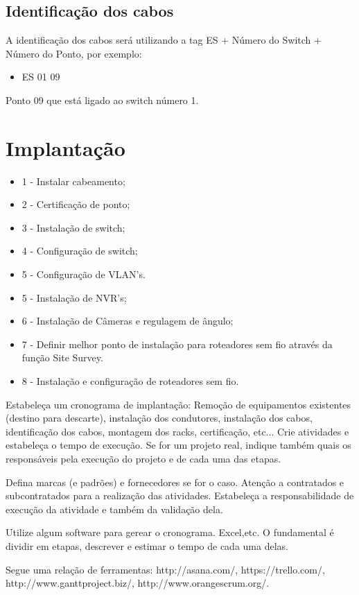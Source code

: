 \documentclass[	DIV=calc,%
							paper=a4,%
							fontsize=12pt,%
							onecolumn]{scrartcl}	 					%
\begin{document}
\subsection{Identificação dos cabos}

A identificação dos cabos será utilizando a tag ES + Número do Switch + Número do Ponto, por exemplo:
\begin{itemize}
\item ES 01 09
\end{itemize}
Ponto 09 que está ligado ao switch número 1.

\section{Implantação}
\begin{itemize}
\item 1 - Instalar cabeamento;
\item 2 - Certificação de ponto;
\item 3 - Instalação de switch;
\item 4 - Configuração de switch;
\item 5 - Configuração de VLAN's.
\item 5 - Instalação de NVR's;
\item 6 - Instalação de Câmeras e regulagem de ângulo;
\item 7 - Definir melhor ponto de instalação para roteadores sem fio através da função Site Survey.
\item 8 - Instalação e configuração de roteadores sem fio.

\end{itemize}


Estabeleça um cronograma de implantação:
Remoção de equipamentos existentes (destino para descarte), instalação dos condutores, instalação dos cabos, 
identificação dos cabos, montagem dos racks, certificação, etc... Crie atividades e estabeleça o tempo de execução. Se for um projeto real, indique também quais os responsáveis pela execução do projeto e de cada uma das etapas.

Defina marcas (e padrões) e fornecedores se for o caso. Atenção a contratados e subcontratados para a realização das atividades. Estabeleça a responsabilidade de execução da atividade e também da validação dela.

Utilize algum software para gerear o cronograma. Excel,etc. O fundamental é dividir em etapas, descrever e estimar o tempo de cada uma delas.

Segue uma relação de ferramentas:
http://asana.com/, 
https://trello.com/, 
http://www.ganttproject.biz/, 
http://www.orangescrum.org/. 
\end{document}
